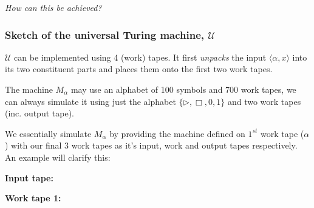 \documentclass{article}
\newcommand{\U}{\mathcal{U}}
\begin{document}
      \textit{How can this be achieved?}

      \subsubsection{Sketch of the universal Turing machine, $\mathcal{U}$}

      $\U$ can be implemented using 4 (work) tapes. It first \textit{unpacks}  the input $\langle \alpha , x \rangle $ into its two constituent parts and places them onto the first two work tapes.

      The machine $M_{\alpha }$ may use an alphabet of 100 symbols and 700 work tapes, we can always simulate it using just the alphabet $\{ \rhd, \Box,0,1 \} $ and two work tapes (inc. output tape).

      We essentially simulate $M_{\alpha }$ by providing the machine defined on $1^{st}$ work tape ($\alpha $) with our final 3 work tapes as it's input, work and output tapes respectively. An example will clarify this:



  \textbf{Input tape:}
  \begin{center}


  \end{center}

  \textbf{Work tape 1:}
  \begin{center}


  \end{center}
\end{document}
